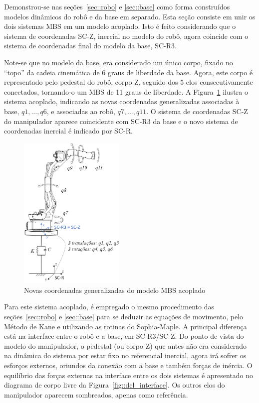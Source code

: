 Demonstrou-se nas seções~\ref{sec::robo} e \ref{sec::base} como forma
construídos modelos dinâmicos do robô e da base em separado. Esta seção consiste
em unir os dois sistemas MBS em um modelo acoplado.
Isto é feito considerando que o sistema de coordenadas SC-Z, inercial no modelo
do robô, agora coincide com o sistema de coordenadas final do modelo da base,
SC-R3.

Note-se que no modelo da base, era considerado um único corpo, fixado no
``topo'' da cadeia cinemática de 6 graus de liberdade da base.
Agora, este corpo é representado pelo pedestal do robô, corpo Z, seguido dos 5
elos consecutivamente conectados, tornando-o um MBS de 11 graus de liberdade. A
Figura~\ref{fig::esq_acoplado} ilustra o sistema acoplado, indicando as novas
coordenadas generalizadas associadas à base, $q1,\ldots,q6$, e associadas ao
robô, $q7,\ldots,q11$. O sistema de coordenadas SC-Z do manipulador aparece
coincidente com SC-R3 da base e o novo sistema de coordenadas inercial é
indicado por SC-R.

\begin{figure}[h]
	\centering 
 	\includegraphics[width=0.45\textwidth]{figs/esq_acoplado}
 	\caption{Novas coordenadas generalizadas do modelo MBS acoplado}
 	\label{fig::esq_acoplado}
\end{figure}

Para este sistema acoplado, é empregado o mesmo procedimento das
seções~\ref{sec::robo} e \ref{sec::base} para se deduzir as equações de
movimento, pelo Método de Kane e utilizando as rotinas do Sophia-Maple. A
principal diferença está na interface entre o robô e a base, em SC-R3/SC-Z.
Do ponto de vista do modelo do manipulador, o pedestal (ou corpo Z) que
antes não era considerado na dinâmica do sistema por estar fixo no referencial
inercial, agora irá sofrer os esforços externos, oriundos da conexão com a base
e também forças de inércia. O equilíbrio das forças externas na interface entre
os dois sistemas é apresentado no diagrama de corpo livre da
Figura~\ref{fig::dcl_interface}. Os outros elos do manipulador aparecem
sombreados, apenas como referência.

